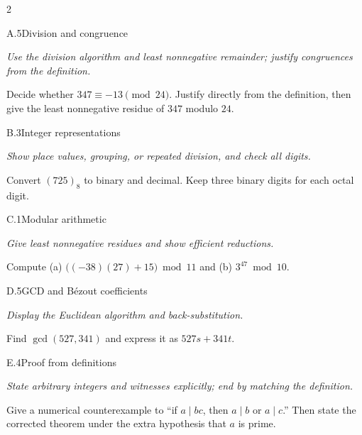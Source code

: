 \documentclass[9pt]{extarticle}
\begin{document}
\begin{multicols}{2}
\begin{CoreProblem}{A.5}{Division and congruence}
{\scriptsize\textit{Use the division algorithm and least nonnegative remainder; justify congruences from the definition.}\par}
Decide whether $347\equiv-13\pmod{24}$. Justify directly from the definition,
then give the least nonnegative residue of $347$ modulo $24$.
\end{CoreProblem}
\begin{CoreProblem}{B.3}{Integer representations}
{\scriptsize\textit{Show place values, grouping, or repeated division, and check all digits.}\par}
Convert $(725)_8$ to binary and decimal. Keep three binary digits for each
octal digit.
\end{CoreProblem}
\begin{CoreProblem}{C.1}{Modular arithmetic}
{\scriptsize\textit{Give least nonnegative residues and show efficient reductions.}\par}
Compute (a) $\bigl((-38)(27)+15\bigr)\bmod11$ and
(b) $3^{47}\bmod10$.
\end{CoreProblem}
\columnbreak
\begin{CoreProblem}{D.5}{GCD and B\'ezout coefficients}
{\scriptsize\textit{Display the Euclidean algorithm and back-substitution.}\par}
Find $\gcd(527,341)$ and express it as $527s+341t$.
\end{CoreProblem}
\begin{CoreProblem}{E.4}{Proof from definitions}
{\scriptsize\textit{State arbitrary integers and witnesses explicitly; end by matching the definition.}\par}
Give a numerical counterexample to ``if $a\mid bc$, then $a\mid b$ or
$a\mid c$.'' Then state the corrected theorem under the extra hypothesis that
$a$ is prime.
\end{CoreProblem}
\end{multicols}
\CoreWorkArea
\FormBreak
{}
\end{document}
